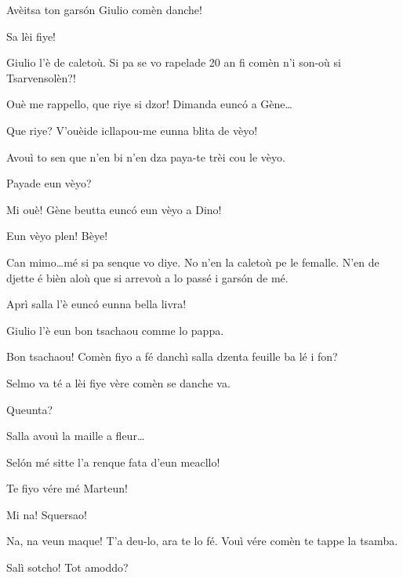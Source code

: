 \begin{drama}
\Djouiyaoudouspeaks{} Avèitsa ton gars\'on Giulio comèn danche!

\Marteunspeaks Sa lèi fiye!

\Selmospeaks	Giulio l'è de caletoù. Si pa se vo rapelade 20 an fi comèn n’i son-où si Tsarvensolèn?!


\Djouiyaoueunspeaks Ouè me rappello, que riye si dzor! Dimanda eunc\'o a Gène\ldots

\Genespeaks{} Que riye? V'ouèide icllapou-me eunna blita de vèyo!

\Djouiyaoudouspeaks Avouì to sen que n'en bi n'en dza paya-te trèi cou le vèyo.

\Dinospeaks{} Payade eun vèyo?

\Djouiyaoueunspeaks Mi ouè! Gène beutta eunc\'o eun vèyo a Dino!

\Dinospeaks{} Eun vèyo plen! Bèye!

\Selmospeaks {} Can mimo\ldots mé si pa senque vo diye. No n'en la caletoù pe le femalle. N'en de djette é bièn aloù que si arrevoù a lo passé i gars\'on de mé.

\Djouiyaoudouspeaks Aprì salla l'è eunc\'o eunna bella livra!

\Selmospeaks Giulio l’è eun bon tsachaou comme lo pappa.

\Marteunspeaks{} Bon tsachaou! Comèn fiyo a fé danchì salla dzenta feuille ba lé i fon? 

\Djouiyaoudouspeaks Selmo va té a lèi fiye vère comèn se danche va.

\Selmospeaks Queunta?

\Marteunspeaks{} Salla avouì la maille a fleur\ldots

\Djouiyaoueunspeaks Sel\'on mé sitte l'a renque fata d'eun meacllo!

\Selmospeaks Te fiyo vére mé Marteun!


\Marteunspeaks Mi na! Squersao!

\Selmospeaks Na, na veun maque! T'a deu-lo, ara te lo fé. Vouì vére comèn te tappe la tsamba.


\Selmospeaks{} Salì sotcho! Tot amoddo?


\end{drama}
